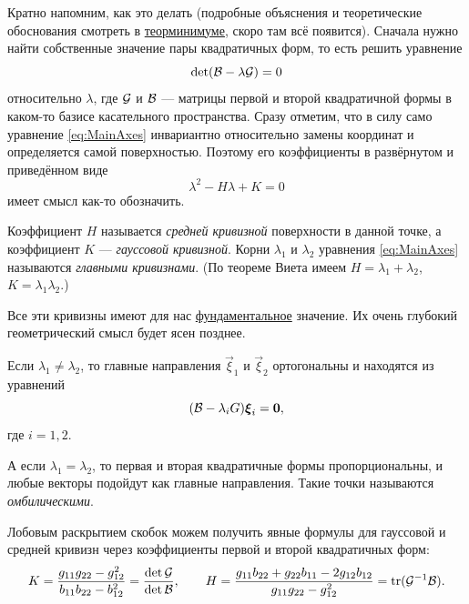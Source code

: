 
Кратно напомним, как это делать (подробные объяснения и теоретические обоснования смотреть в \href{https://github.com/pshenikita/Linal-Teormin}{теорминимуме}, скоро там всё появится). Сначала нужно найти собственные значение пары квадратичных форм, то есть решить уравнение
\begin{equation} \label{eq:MainAxes}
	\det(\mathcal{B} - \lambda\mathcal{G}) = 0
\end{equation}
относительно $\lambda$, где $\mathcal{G}$ и $\mathcal{B}$ --- матрицы первой и второй квадратичной формы в каком-то базисе касательного пространства. Сразу отметим, что в силу само уравнение \eqref{eq:MainAxes} инвариантно относительно замены координат и определяется самой поверхностью. Поэтому его коэффициенты в развёрнутом и приведённом виде
\[
	\lambda^2 -H\lambda + K = 0
\]
имеет смысл как-то обозначить.

\begin{definition}
	Коэффициент $H$ называется \textit{средней кривизной} поверхности в данной точке\footnotemark, а коэффициент $K$ --- \textit{гауссовой кривизной}. Корни $\lambda_1$ и $\lambda_2$ уравнения \eqref{eq:MainAxes} называются \textit{главными кривизнами}. (По теореме Виета имеем $H = \lambda_1 + \lambda_2$, $K = \lambda_1\lambda_2$.)
\end{definition}


Все эти кривизны имеют для нас \underline{фундаментальное} значение. Их очень глубокий геометрический смысл будет ясен позднее.

Если $\lambda_1 \ne \lambda_2$, то главные направления $\vec{\xi}_1$ и $\vec{\xi}_2$ ортогональны и находятся из уравнений
\[
	(\mathcal{B} - \lambda_iG)\boldsymbol{\xi}_i = \boldsymbol{0},
\]
где $i = 1, 2$.

А если $\lambda_1 = \lambda_2$, то первая и вторая квадратичные формы пропорциональны, и любые векторы подойдут как главные направления. Такие точки называются \textit{омбилическими}.

Лобовым раскрытием скобок можем получить явные формулы для гауссовой и средней кривизн через коэффициенты первой и второй квадратичных форм:
\[
	K = \frac{g_{11}g_{22} - g_{12}^2}{b_{11}b_{22} - b_{12}^2} = \frac{\det\mathcal{G}}{\det\mathcal{B}},\qquad H = \frac{g_{11}b_{22} + g_{22}b_{11} - 2g_{12}b_{12}}{g_{11}g_{22} - g_{12}^2} = \operatorname{tr}(\mathcal{G}^{-1}\mathcal{B}).
\]

